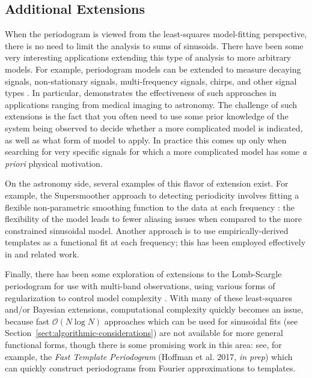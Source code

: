 \documentclass[preprint]{aastex}
\newcommand{\Sect}[1]{Section~\ref{sect:#1}}
\newcommand{\sect}[1]{\Sect{#1}}
\begin{document}
\subsection{Additional Extensions}
When the periodogram is viewed from the least-squares model-fitting perspective,
there is no need to limit the analysis to sums of sinusoids.
There have been some very interesting applications extending this type of
analysis to more arbitrary models.
For example, periodogram models can be extended to measure
decaying signals, non-stationary signals, multi-frequency signals, chirps,
and other signal types \citep[see, e.g.][]{Jaynes87, Bretthorst88, Gregory2001}.
In particular, \citet{Bretthorst88} demonstrates the effectiveness of such
approaches in applications ranging from medical imaging to astronomy.
The challenge of such extensions is the fact that you often need to use some
prior knowledge of the system being observed to decide whether a more
complicated model is indicated, as well as what form of model to apply.
In practice this comes up only when searching for very specific signals for
which a more complicated model has some {\it a priori} physical motivation.

On the astronomy side, several examples of this flavor of extension exist.
For example, the Supersmoother approach to detecting periodicity
involves fitting a flexible non-parametric smoothing
function to the data at each frequency \citep{Reimann94}: the flexibility
of the model leads to fewer aliasing issues when compared to the more
constrained sinusoidal model.
Another approach is to use empirically-derived templates as a functional fit
at each frequency; this has been employed effectively in \citet{Sesar2010,
Sesar2013} and related work.

Finally, there has been some exploration of extensions to the Lomb-Scargle
periodogram for use with multi-band observations, using various forms of
regularization to control model complexity \citep{VanderPlas2015, Long2016}.
With many of these least-squares and/or Bayesian extensions,
computational complexity quickly becomes an issue, because fast
$\mathcal{O}(N\log N)$ approaches which can be used for sinusoidal fits
(see \sect{algorithmic-considerations}) are not available for more general
functional forms, though there is some promising work in this area: see,
for example, the {\it Fast Template Periodogram} (Hoffman et al. 2017,
{\it in prep}) which can quickly construct periodograms from Fourier
approximations to templates.
\end{document}
